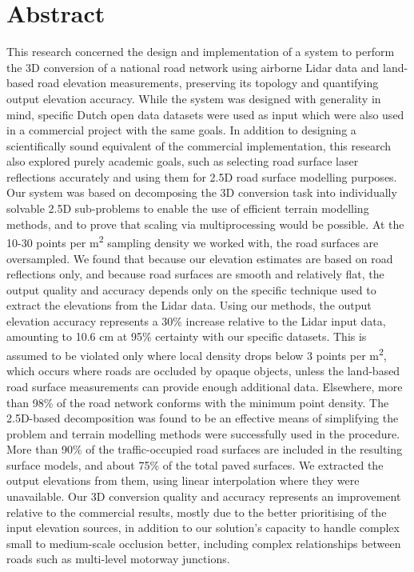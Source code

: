 \chapter*{Abstract}

This research concerned the design and implementation of a system to perform the 3D conversion of a national road network using airborne Lidar data and land-based road elevation measurements, preserving its topology and quantifying output elevation accuracy. While the system was designed with generality in mind, specific Dutch open data datasets were used as input which were also used in a commercial project with the same goals. In addition to designing a scientifically sound equivalent of the commercial implementation, this research also explored purely academic goals, such as selecting road surface laser reflections accurately and using them for 2.5D road surface modelling purposes. Our system was based on decomposing the 3D conversion task into individually solvable 2.5D sub-problems to enable the use of efficient terrain modelling methods, and to prove that scaling via multiprocessing would be possible. At the 10-30 points per m\textsuperscript{2} sampling density we worked with, the road surfaces are oversampled. We found that because our elevation estimates are based on road reflections only, and because road surfaces are smooth and relatively flat, the output quality and accuracy depends only on the specific technique used to extract the elevations from the Lidar data. Using our methods, the output elevation accuracy represents a 30\% increase relative to the Lidar input data, amounting to 10.6 cm at 95\% certainty with our specific datasets. This is assumed to be violated only where local density drops below 3 points per m\textsuperscript{2}, which occurs where roads are occluded by opaque objects, unless the land-based road surface measurements can provide enough additional data. Elsewhere, more than 98\% of the road network conforms with the minimum point density. The 2.5D-based decomposition was found to be an effective means of simplifying the problem and terrain modelling methods were successfully used in the procedure. More than 90\% of the traffic-occupied road surfaces are included in the resulting surface models, and about 75\% of the total paved surfaces. We extracted the output elevations from them, using linear interpolation where they were unavailable. Our 3D conversion quality and accuracy represents an improvement relative to the commercial results, mostly due to the better prioritising of the input elevation sources, in addition to our solution's capacity to handle complex small to medium-scale occlusion better, including complex relationships between roads such as multi-level motorway junctions.